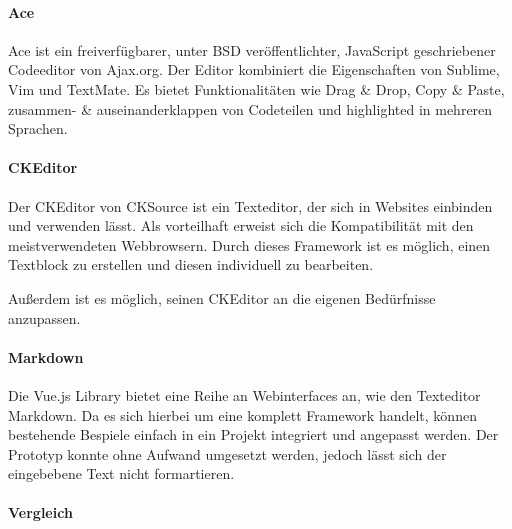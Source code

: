 
\paragraph{Ace}
Ace ist ein freiverfügbarer, unter BSD veröffentlichter, JavaScript geschriebener Codeeditor von Ajax.org. Der Editor kombiniert die Eigenschaften von Sublime, Vim und TextMate. Es bietet Funktionalitäten wie Drag \& Drop, Copy \& Paste, zusammen- \& auseinanderklappen von Codeteilen und highlighted in mehreren Sprachen. \cite{ACE, BSD}


\paragraph{CKEditor}
Der CKEditor von CKSource ist ein Texteditor, der sich in Websites einbinden und verwenden lässt. Als vorteilhaft erweist sich die Kompatibilität mit den meistverwendeten Webbrowsern. Durch dieses Framework ist es möglich, einen Textblock zu erstellen und diesen individuell zu bearbeiten.

Außerdem ist es möglich, seinen CKEditor an die eigenen Bedürfnisse anzupassen.\cite{CKEDITOR}


\paragraph{Markdown}
Die Vue.js Library bietet eine Reihe an Webinterfaces an, wie den Texteditor Markdown. Da es sich hierbei um eine komplett Framework handelt, können bestehende Bespiele einfach in ein Projekt integriert und angepasst werden. Der Prototyp konnte ohne Aufwand umgesetzt werden, jedoch lässt sich der eingebebene Text nicht formartieren. \cite{MARKDOWN}


\paragraph{Vergleich}


\newpage

